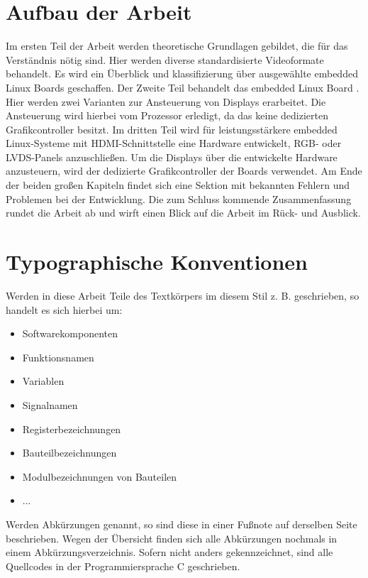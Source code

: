 \section{Aufbau der Arbeit}
Im ersten Teil der Arbeit werden theoretische Grundlagen gebildet, die für das Verständnis nötig sind. Hier werden diverse standardisierte Videoformate behandelt. Es wird ein Überblick und klassifizierung über ausgewählte embedded Linux Boards geschaffen.
Der Zweite Teil behandelt das embedded Linux Board . Hier werden zwei Varianten zur Ansteuerung von Displays erarbeitet. Die Ansteuerung wird hierbei vom Prozessor erledigt, da das  keine dedizierten Grafikcontroller besitzt.
Im dritten Teil wird für leistungsstärkere embedded Linux-Systeme mit HDMI-Schnittstelle eine Hardware entwickelt, RGB- oder LVDS-Panels anzuschließen. Um die Displays über die entwickelte Hardware anzusteuern, wird der dedizierte Grafikcontroller der Boards verwendet. Am Ende der beiden großen Kapiteln findet sich eine Sektion mit bekannten Fehlern und Problemen bei der Entwicklung. Die zum Schluss kommende Zusammenfassung rundet die Arbeit ab und wirft einen Blick auf die Arbeit im Rück- und Ausblick. 

\section{Typographische Konventionen}
Werden in diese Arbeit Teile des Textkörpers im diesem Stil z. B.  geschrieben, so handelt es sich hierbei um:
\begin{itemize}
\item Softwarekomponenten
\item Funktionsnamen
\item Variablen
\item Signalnamen
\item Registerbezeichnungen
\item Bauteilbezeichnungen
\item Modulbezeichnungen von Bauteilen
\item ...
\end{itemize}
Werden Abkürzungen genannt, so sind diese in einer Fußnote auf derselben Seite beschrieben. Wegen der Übersicht finden sich alle Abkürzungen nochmals in einem Abkürzungsverzeichnis.
Sofern nicht anders gekennzeichnet, sind alle Quellcodes in der Programmiersprache C geschrieben.
